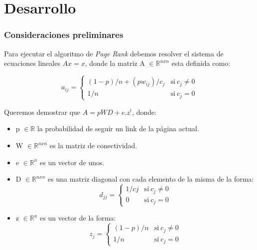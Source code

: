 \section{Desarrollo}

\subsubsection{Consideraciones preliminares} %

Para ejecutar el algoritmo de \emph{Page Rank} debemos resolver el sistema de ecuaciones lineales $A x = x$, donde la matriz A $\in \mathbb{R}^{nxn}$ esta definida como:

\begin{equation}
    a_{ij} = \left\{
            \begin{array}{ll}
                 (1-p)/n + (pw_{ij})/c_j      & \mathrm{si\ } c_j \neq 0 \\
                 1/n & \mathrm{si\ } c_j = 0
            \end{array}
        \right.
\end{equation}

Queremos demostrar que $A = pWD + e.z^t$, donde:  
\begin{itemize}
	\item p $\in \mathbb{R}$ la probabilidad de seguir un link de la página actual.  
	\item W $\in \mathbb{R}^{nxn}$ es la matriz de conectividad.  
	\item e $\in \mathbb{R}^{n}$ es un vector de unos.
    \item D $\in \mathbb{R}^{nxn}$ es una matriz diagonal con cada elemento de la misma de la forma:     
    \begin{equation}
    	\label{defd}
        d_{jj} = \left\{
                \begin{array}{ll}
                     1/cj & \mathrm{si\ } c_j \neq 0 \\
                     0    & \mathrm{si\ } c_j = 0
                \end{array}
            \right.
    \end{equation}
    \item z $\in \mathbb{R}^{n}$ es un vector de la forma:  
    \begin{equation}
    	\label{defz}
        z_{j} = \left\{
                \begin{array}{ll}
                     (1-p)/n      & \mathrm{si\ } c_j \neq 0 \\
                     1/n & \mathrm{si\ } c_j = 0
                \end{array}
            \right.
    \end{equation}
\end{itemize}

